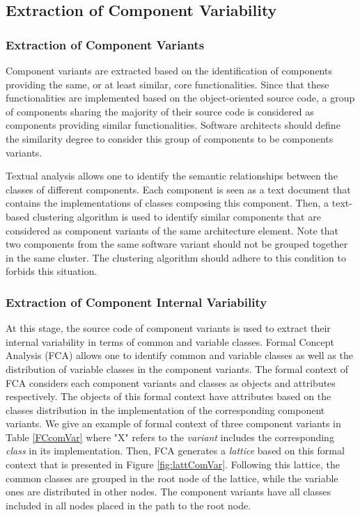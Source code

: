 \documentclass[graybox]{svmult}
\begin{document}
\subsection{Extraction of Component Variability}
\subsubsection{Extraction of Component Variants}
Component variants are extracted based on the identification of components providing the same, or at least similar, core functionalities. Since that these functionalities are implemented based on the object-oriented source code, a group of components sharing the majority of their source code is considered as components providing similar functionalities. Software architects should define the similarity degree to consider this group of components to be components variants.

Textual analysis allows one to identify the semantic relationships between the classes of different components. 
Each component is seen as a text document that contains the implementations of classes composing this component.
Then, a text-based clustering algorithm is used to identify similar components that are considered as component variants of the same architecture element. 
Note that two components from the same software variant should not be grouped together in the same cluster. The clustering algorithm should adhere to this condition to forbids this situation.

\subsubsection{Extraction of Component Internal Variability}
At this stage, the source code of component variants is used to extract their internal variability in terms of common and variable classes.
Formal Concept Analysis (FCA) allows one to identify common and variable classes as well as the distribution of variable classes in the component variants. The formal context of FCA considers each component variants and classes as objects and attributes respectively. The objects of this formal context have attributes based on the classes distribution in the implementation of the corresponding component variants. We give an example of formal context of three component variants in 
Table \ref{FCcomVar} where "X" refers to the \textit{variant} includes the corresponding \textit{class} in its implementation. Then, FCA generates a \textit{lattice} based on this formal context that is presented in Figure \ref{fig:lattComVar}. Following this lattice, the common classes are grouped in the root node of the lattice, while the variable ones are distributed in other nodes. The component variants have all classes included in all nodes placed in the path to the root node.
\end{document}
